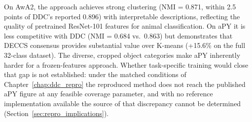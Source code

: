 On AwA2, the approach achieves strong clustering (NMI = 0.871, within 2.5 points of DDC's reported 0.896) with interpretable descriptions, reflecting the quality of pretrained ResNet-101 features for animal classification. On aPY it is less competitive with DDC (NMI = 0.684 vs.\ 0.863) but demonstrates that DECCS consensus provides substantial value over K-means (+15.6\% on the full 32-class dataset). The diverse, cropped object categories make aPY inherently harder for a frozen-features approach. Whether task-specific training would close that gap is not established: under the matched conditions of Chapter~\ref{chap:ddc_repro} the reproduced method does not reach the published aPY figure at any feasible coverage parameter, and with no reference implementation available the source of that discrepancy cannot be determined (Section~\ref{sec:repro_implications}).